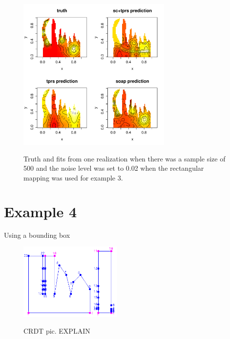 \documentclass[a4paper,10pt]{amsart}
\begin{document}
\begin{figure}
\centering
\includegraphics[width=3in]{figs-otherdomains/wigglytop2-real.pdf} \\
\caption{Truth and fits from one realization when there was a sample size of 500 and the noise level was set to 0.02 when the rectangular mapping was used for example 3. }
\label{wigglytop2-real}
\end{figure}





\section{Example 4}

Using a bounding box


\begin{figure}
\centering
\includegraphics[width=2in]{figs-otherdomains/wigglytop2-bbox-numbered.png} \\
\caption{CRDT pic. EXPLAIN}
\label{wigglytop2-bbox-numbered}
\end{figure}
\end{document}
